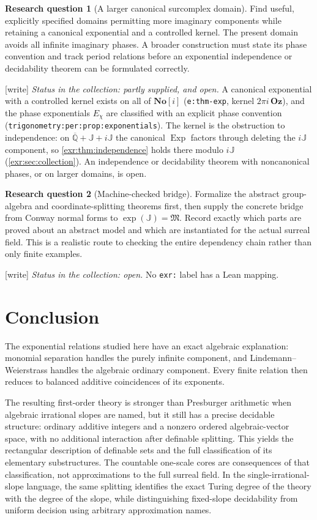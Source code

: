 \documentclass[11pt,letterpaper]{article}
\numberwithin{equation}{section}
\theoremstyle{definition}
\newtheorem{question}{Research question}
\theoremstyle{remark}
\newcommand{\Oz}{\mathbf{Oz}}
\newcommand{\SC}{\mathbf{No}[i]}
\newcommand{\Qb}{\overline{\mathbb Q}}
\newcommand{\J}{\mathbb J}
\newcommand{\M}{\mathfrak M}
\newcommand{\Exp}{\operatorname{Exp}}
\newcommand{\lbl}[1]{\nolinkurl{#1}}%
\newcommand{\wtag}{\textup{[write]}}%
\begin{document}
\begin{question}[A larger canonical surcomplex domain]\label{exr:q:surcomplex}
Find useful, explicitly specified domains permitting more imaginary components
while retaining a canonical exponential and a controlled kernel. The present
domain avoids all infinite imaginary phases. A broader construction must state
its phase convention and track period relations before an exponential
independence or decidability theorem can be formulated correctly.
\end{question}
\wtag{} \emph{Status in the collection: partly supplied, and open.} A
canonical exponential with a controlled kernel exists on all of $\SC$
(\lbl{e:thm-exp}, kernel $2\pi i\,\Oz$), and the phase exponentials $E_\chi$
are classified with an explicit phase convention
(\lbl{trigonometry:per:prop:exponentials}). The kernel is the obstruction to
independence: on $\Qb+\J+i\J$ the canonical $\Exp$ factors through deleting the
$i\J$ component, so \cref{exr:thm:independence} holds there modulo $i\J$
(\cref{exr:sec:collection}). An independence or decidability theorem with
noncanonical phases, or on larger domains, is open.


\begin{question}[Machine-checked bridge]\label{exr:q:formal}
Formalize the abstract group-algebra and coordinate-splitting theorems first, then
supply the concrete bridge from Conway normal forms to
$\exp(\J)=\M$. Record exactly which parts are proved about an abstract model and
which are instantiated for the actual surreal field. This is a realistic route to
checking the entire dependency chain rather than only finite examples.
\end{question}
\wtag{} \emph{Status in the collection: open.} No \texttt{exr:} label has
a Lean mapping.


\section{Conclusion}
The exponential relations studied here have an exact algebraic explanation:
monomial separation handles the purely infinite component, and
Lindemann--Weierstrass handles the algebraic ordinary component. Every finite
relation then reduces to balanced additive coincidences of its exponents.

The resulting first-order theory is stronger than Presburger arithmetic when
algebraic irrational slopes are named, but it still has a precise decidable
structure: ordinary additive integers and a nonzero ordered algebraic-vector
space, with no additional interaction after definable splitting. This yields the
rectangular description of definable sets and the full classification of
its elementary substructures. The countable one-scale cores are consequences of
that classification, not approximations to the full surreal field. In the
single-irrational-slope language, the same splitting identifies the exact Turing
degree of the theory with the degree of the slope, while distinguishing
fixed-slope decidability from uniform decision using arbitrary approximation
names.
\end{document}
